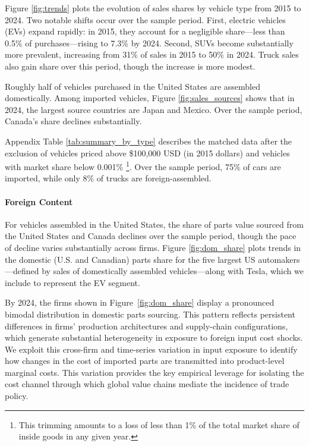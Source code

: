 \documentclass[11pt]{article}
\begin{document}
Figure \ref{fig:trends} plots the evolution of sales shares by vehicle type from 2015 to 2024. Two notable shifts occur over the sample period. First, electric vehicles (EVs) expand rapidly: in 2015, they account for a negligible share---less than 0.5\% of purchases---rising to 7.3\% by 2024. Second, SUVs become substantially more prevalent, increasing from 31\% of sales in 2015 to 50\% in 2024. Truck sales also gain share over this period, though the increase is more modest.

Roughly half of vehicles purchased in the United States are assembled domestically. Among imported vehicles, Figure \ref{fig:sales_sources} shows that in 2024, the largest source countries are Japan and Mexico. Over the sample period, Canada’s share declines substantially.

Appendix Table \ref{tab:summary_by_type} describes the matched data after the exclusion of vehicles priced above \$100,000 USD (in 2015 dollars) and vehicles with market share below 0.001\% \footnote{This trimming amounts to a loss of less than 1\% of the total market share of inside goods in any given year.}. Over the sample period, 75\% of cars are imported, while only 8\% of trucks are foreign-assembled.

\paragraph{Foreign Content}
For vehicles assembled in the United States, the share of parts value sourced from the United States and Canada declines over the sample period, though the pace of decline varies substantially across firms. Figure \ref{fig:dom_share} plots trends in the domestic (U.S. and Canadian) parts share for the five largest US automakers—defined by sales of domestically assembled vehicles—along with Tesla, which we include to represent the EV segment.

By 2024, the firms shown in Figure~\ref{fig:dom_share} display a pronounced bimodal distribution in domestic parts sourcing. This pattern reflects persistent differences in firms' production architectures and supply-chain configurations, which generate substantial heterogeneity in exposure to foreign input cost shocks. We exploit this cross-firm and time-series variation in input exposure to identify how changes in the cost of imported parts are transmitted into product-level marginal costs. This variation provides the key empirical leverage for isolating the cost channel through which global value chains mediate the incidence of trade policy.
\end{document}

